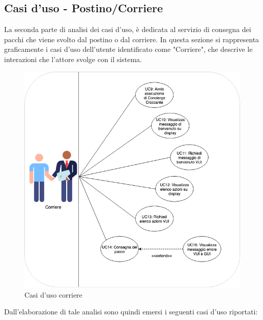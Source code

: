 \subsection{Casi d'uso - Postino/Corriere}
La seconda parte di analisi dei casi d'uso, è dedicata al servizio di consegna dei pacchi che viene svolto dal postino o dal corriere. In questa sezione si rappresenta graficamente i casi d'uso dell'utente identificato come "Corriere", che descrive le interazioni che l'attore svolge con il sistema.
\begin{figure}[H] 
    \centering 
    \includegraphics[width=1\columnwidth]{immagini/casi_duso3.png}
    \caption{\label{fig:casi_duso_corriere}Casi d'uso corriere}
\end{figure}
Dall'elaborazione di tale analisi sono quindi emersi i seguenti casi d'uso riportati:
